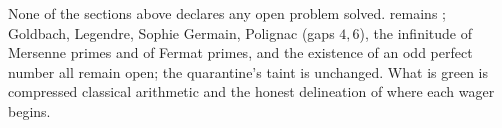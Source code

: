 \begin{remark}
None of the sections above declares any open problem solved.  remains
; Goldbach, Legendre, Sophie Germain, Polignac (gaps $4,6$), the infinitude of Mersenne
primes and of Fermat primes, and the existence of an odd perfect number all remain \red{} open; the
quarantine's taint is unchanged. What is green is compressed classical arithmetic and the honest
delineation of where each wager begins.
\end{remark}
